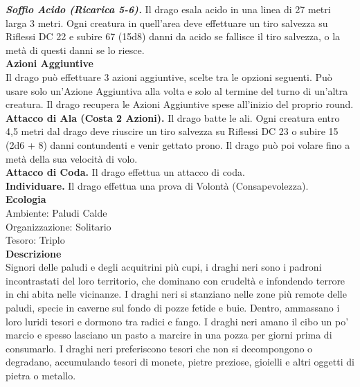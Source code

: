 \begin{multicols}{2}
\emph{\textbf{Soffio Acido (Ricarica 5-6).}} Il drago esala acido in una linea di 27 metri larga 3 metri. Ogni creatura in quell'area deve effettuare un tiro salvezza su Riflessi DC 22 e subire 67 (15d8) danni da acido se fallisce il tiro salvezza, o la metà di questi danni se lo riesce.\\
\textbf{Azioni Aggiuntive}\\
Il drago può effettuare 3 azioni aggiuntive, scelte tra le opzioni seguenti. Può usare solo un'Azione Aggiuntiva alla volta e solo al termine del turno di un'altra creatura. Il drago recupera le Azioni Aggiuntive spese all'inizio del proprio round.\\
\textbf{Attacco di Ala (Costa 2 Azioni).} Il drago batte le ali. Ogni creatura entro 4,5 metri dal drago deve riuscire un tiro salvezza su Riflessi DC 23 o subire 15 (2d6 + 8) danni contundenti e venir gettato prono. Il drago può poi volare fino a metà della sua velocità di volo.\\
\textbf{Attacco di Coda.} Il drago effettua un attacco di coda.  \\
\textbf{Individuare.} Il drago effettua una prova di Volontà (Consapevolezza).\\
\textbf{Ecologia}\\
Ambiente: Paludi Calde\\
Organizzazione: Solitario\\
Tesoro: Triplo\\
\textbf{Descrizione}\\
Signori delle paludi e degli acquitrini più cupi, i draghi neri sono i padroni incontrastati del loro territorio, che dominano con crudeltà e infondendo terrore in chi abita nelle vicinanze. I draghi neri si stanziano nelle zone più remote delle paludi, specie in caverne sul fondo di pozze fetide e buie. Dentro, ammassano i loro luridi tesori e dormono tra radici e fango. I draghi neri amano il cibo un po’ marcio e spesso lasciano un pasto a marcire in una pozza per giorni prima di consumarlo. I draghi neri preferiscono tesori che non si decompongono o degradano, accumulando tesori di monete, pietre preziose, gioielli e altri oggetti di pietra o metallo.\\


\end{multicols}
